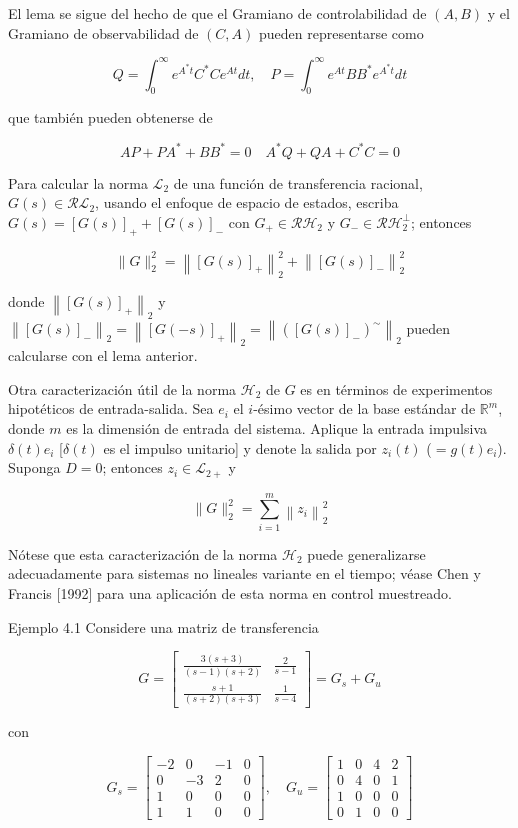 El lema se sigue del hecho de que el Gramiano de controlabilidad de $(A, B)$ y el Gramiano de observabilidad de $(C, A)$ pueden representarse como

$$
Q=\int_{0}^{\infty} e^{A^{*} t} C^{*} C e^{A t} d t, \quad P=\int_{0}^{\infty} e^{A t} B B^{*} e^{A^{*} t} d t
$$

que también pueden obtenerse de

$$
A P+P A^{*}+B B^{*}=0 \quad A^{*} Q+Q A+C^{*} C=0
$$

Para calcular la norma $\mathcal{L}_{2}$ de una función de transferencia racional, $G(s) \in \mathcal{R} \mathcal{L}_{2}$, usando el enfoque de espacio de estados, escriba $G(s)=[G(s)]_{+}+[G(s)]_{-}$ con $G_{+} \in \mathcal{R} \mathcal{H}_{2}$ y $G_{-} \in \mathcal{R} \mathcal{H}_{2}^{\perp}$; entonces

$$
\|G\|_{2}^{2}=\left\|[G(s)]_{+}\right\|_{2}^{2}+\left\|[G(s)]_{-}\right\|_{2}^{2}
$$

donde $\left\|[G(s)]_{+}\right\|_{2}$ y $\left\|[G(s)]_{-}\right\|_{2}=\left\|[G(-s)]_{+}\right\|_{2}=\left\|\left([G(s)]_{-}\right)^{\sim}\right\|_{2}$ pueden calcularse con el lema anterior.

Otra caracterización útil de la norma $\mathcal{H}_{2}$ de $G$ es en términos de experimentos hipotéticos de entrada-salida. Sea $e_{i}$ el $i$-ésimo vector de la base estándar de $\mathbb{R}^{m}$, donde $m$ es la dimensión de entrada del sistema. Aplique la entrada impulsiva $\delta(t) e_{i}$ [$\delta(t)$ es el impulso unitario] y denote la salida por $z_{i}(t)$ ($=g(t) e_{i}$). Suponga $D=0$; entonces $z_{i} \in \mathcal{L}_{2+}$ y

$$
\|G\|_{2}^{2}=\sum_{i=1}^{m}\left\|z_{i}\right\|_{2}^{2}
$$

Nótese que esta caracterización de la norma $\mathcal{H}_{2}$ puede generalizarse adecuadamente para sistemas no lineales variante en el tiempo; véase Chen y Francis [1992] para una aplicación de esta norma en control muestreado.

Ejemplo 4.1 Considere una matriz de transferencia

$$
G=\left[\begin{array}{ll}
\frac{3(s+3)}{(s-1)(s+2)} & \frac{2}{s-1} \\
\frac{s+1}{(s+2)(s+3)} & \frac{1}{s-4}
\end{array}\right]=G_{s}+G_{u}
$$

con

$$
G_{s}=\left[\begin{array}{cc|cc}
-2 & 0 & -1 & 0 \\
0 & -3 & 2 & 0 \\
\hline 1 & 0 & 0 & 0 \\
1 & 1 & 0 & 0
\end{array}\right], \quad G_{u}=\left[\begin{array}{cc|cc}
1 & 0 & 4 & 2 \\
0 & 4 & 0 & 1 \\
\hline 1 & 0 & 0 & 0 \\
0 & 1 & 0 & 0
\end{array}\right]
$$

